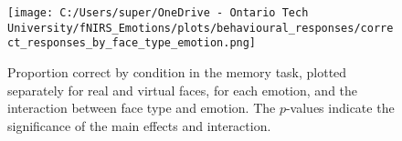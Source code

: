 \begin{figure}[H]
  \centering
  \texttt{[image: C:/Users/super/OneDrive - Ontario Tech University/fNIRS\_Emotions/plots/behavioural\_responses/correct\_responses\_by\_face\_type\_emotion.png]}
  \caption[Correct Memory Task Responses by Face Type and Emotion]{Proportion correct by condition in the memory task, plotted separately for real and virtual faces, for each emotion, and the interaction between face type and emotion. 
  The $p$-values indicate the significance of the main effects and interaction. }
  \label{fig:memory_task_results}
\end{figure}